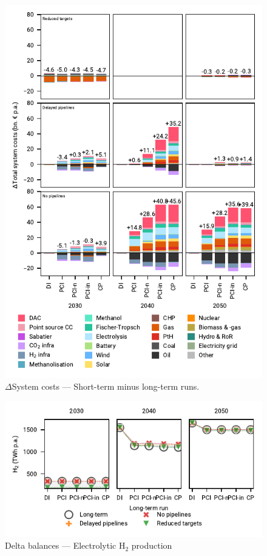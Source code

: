 \documentclass[pdflatex,sn-nature]{sn-jnl}%
\theoremstyle{thmstyleone}%
\theoremstyle{thmstyletwo}%
\theoremstyle{thmstylethree}%
\begin{document}
\begin{appendices}
\begin{figure}[htbp]
  \centering
  \includegraphics{figures/costs_overview_extended}
  \caption{$\Delta$System costs --- Short-term minus long-term runs.}
  \label{fig:costs_overview_extended}
\end{figure}

\begin{figure}[htbp]
  \centering
  \includegraphics{figures/delta_balances_H2 Electrolysis}
  \caption{Delta balances --- Electrolytic H$_2$ production}
  \label{fig:delta_balances_h2_electrolysis}
\end{figure}


\end{appendices}
\end{document}
